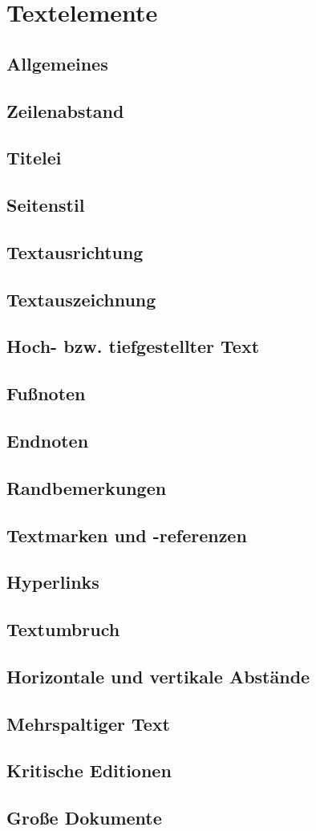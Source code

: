 \chapter{Textelemente}
\section{Allgemeines}
\section{Zeilenabstand}
\section{Titelei}
\section{Seitenstil}
\section{Textausrichtung}
\section{Textauszeichnung}
\section{Hoch- bzw. tiefgestellter Text}
\section{Fußnoten}
\section{Endnoten}
\section{Randbemerkungen}
\section{Textmarken und -referenzen}
\section{Hyperlinks}
\section{Textumbruch}
\section{Horizontale und vertikale Abstände}
\section{Mehrspaltiger Text}
\section{Kritische Editionen}
\section{Große Dokumente}



